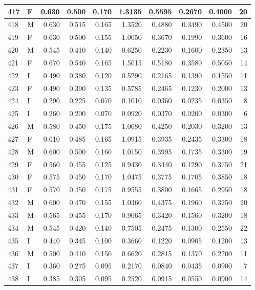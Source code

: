 \documentclass[9pt,twocolumn,twoside,]{pnas-new}
\begin{document}
\begin{tabular}{l|l|r|r|r|r|r|r|r|r}
\hline
417 & F & 0.630 & 0.500 & 0.170 & 1.3135 & 0.5595 & 0.2670 & 0.4000 & 20\\
\hline
418 & M & 0.630 & 0.515 & 0.165 & 1.3520 & 0.4880 & 0.3490 & 0.4500 & 20\\
\hline
419 & F & 0.630 & 0.500 & 0.155 & 1.0050 & 0.3670 & 0.1990 & 0.3600 & 16\\
\hline
420 & M & 0.545 & 0.410 & 0.140 & 0.6250 & 0.2230 & 0.1600 & 0.2350 & 13\\
\hline
421 & F & 0.670 & 0.540 & 0.165 & 1.5015 & 0.5180 & 0.3580 & 0.5050 & 14\\
\hline
422 & I & 0.490 & 0.380 & 0.120 & 0.5290 & 0.2165 & 0.1390 & 0.1550 & 11\\
\hline
423 & F & 0.490 & 0.390 & 0.135 & 0.5785 & 0.2465 & 0.1230 & 0.2000 & 13\\
\hline
424 & I & 0.290 & 0.225 & 0.070 & 0.1010 & 0.0360 & 0.0235 & 0.0350 & 8\\
\hline
425 & I & 0.260 & 0.200 & 0.070 & 0.0920 & 0.0370 & 0.0200 & 0.0300 & 6\\
\hline
426 & M & 0.580 & 0.450 & 0.175 & 1.0680 & 0.4250 & 0.2030 & 0.3200 & 13\\
\hline
427 & F & 0.610 & 0.485 & 0.165 & 1.0915 & 0.3935 & 0.2435 & 0.3300 & 18\\
\hline
428 & M & 0.600 & 0.500 & 0.160 & 1.0150 & 0.3995 & 0.1735 & 0.3300 & 19\\
\hline
429 & F & 0.560 & 0.455 & 0.125 & 0.9430 & 0.3440 & 0.1290 & 0.3750 & 21\\
\hline
430 & F & 0.575 & 0.450 & 0.170 & 1.0475 & 0.3775 & 0.1705 & 0.3850 & 18\\
\hline
431 & F & 0.570 & 0.450 & 0.175 & 0.9555 & 0.3800 & 0.1665 & 0.2950 & 18\\
\hline
432 & M & 0.600 & 0.470 & 0.155 & 1.0360 & 0.4375 & 0.1960 & 0.3250 & 20\\
\hline
433 & M & 0.565 & 0.455 & 0.170 & 0.9065 & 0.3420 & 0.1560 & 0.3200 & 18\\
\hline
434 & M & 0.545 & 0.420 & 0.140 & 0.7505 & 0.2475 & 0.1300 & 0.2550 & 22\\
\hline
435 & I & 0.440 & 0.345 & 0.100 & 0.3660 & 0.1220 & 0.0905 & 0.1200 & 13\\
\hline
436 & M & 0.500 & 0.410 & 0.150 & 0.6620 & 0.2815 & 0.1370 & 0.2200 & 11\\
\hline
437 & I & 0.360 & 0.275 & 0.095 & 0.2170 & 0.0840 & 0.0435 & 0.0900 & 7\\
\hline
438 & I & 0.385 & 0.305 & 0.095 & 0.2520 & 0.0915 & 0.0550 & 0.0900 & 14\\

\end{tabular}
\end{document}
